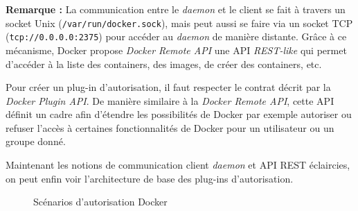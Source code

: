 \documentclass[11pt,a4paper,oneside]{report}
\newcommand{\code}[1]{\texttt{#1}}
\begin{document}
\textbf{Remarque : } La communication entre le \textit{daemon} et le client\cite{docker_doc_daemon} se fait à travers un socket Unix (\code{/var/run/docker.sock}), mais peut aussi se faire via un socket TCP (\code{tcp://0.0.0.0:2375}) pour accéder au \textit{daemon} de manière distante. Grâce à ce mécanisme, Docker propose \textit{Docker Remote API}\cite{docker_doc_remote_api} une API \textit{REST-like} qui permet d'accéder à la liste des containers, des images, de créer des containers, etc.

Pour créer un plug-in d'autorisation, il faut respecter le contrat décrit par la \textit{Docker Plugin API}. De manière similaire à la \textit{Docker Remote API}, cette API définit un cadre afin d'étendre les possibilités de Docker par exemple autoriser ou refuser l'accès à certaines fonctionnalités de Docker pour un utilisateur ou un groupe donné.


Maintenant les notions de communication client \textit{daemon} et API REST éclaircies, on peut enfin voir l'architecture de base des plug-ins d'autorisation.

\begin{figure}[H]
    \hfill

    \caption[]{Scénarios d'autorisation Docker\protect{\footnotemark}}
\end{figure}
\end{document}
